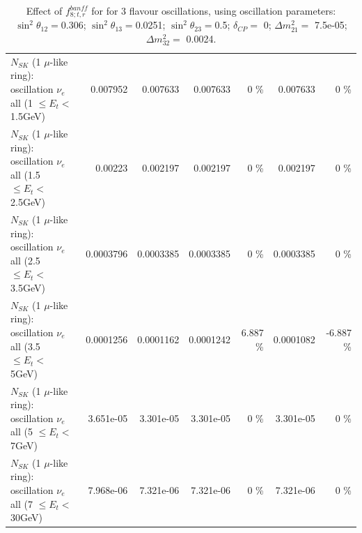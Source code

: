 \begin{table}
\begin{tabular}{| l | r | r | r  r | r  r |}
$N_{SK}$ (1 $\mu$-like ring): oscillation $\nu_{e}$ all (1 $\leq E_{t} <$ 1.5GeV) &        0.007952 &        0.007633 &        0.007633 &        0 \%  &        0.007633 &        0 \%  \\ 
$N_{SK}$ (1 $\mu$-like ring): oscillation $\nu_{e}$ all (1.5 $\leq E_{t} <$ 2.5GeV) &         0.00223 &        0.002197 &        0.002197 &        0 \%  &        0.002197 &        0 \%  \\ 
$N_{SK}$ (1 $\mu$-like ring): oscillation $\nu_{e}$ all (2.5 $\leq E_{t} <$ 3.5GeV) &       0.0003796 &       0.0003385 &       0.0003385 &        0 \%  &       0.0003385 &        0 \%  \\ 
$N_{SK}$ (1 $\mu$-like ring): oscillation $\nu_{e}$ all (3.5 $\leq E_{t} <$ 5GeV) &       0.0001256 &       0.0001162 &       0.0001242 &    6.887 \%  &       0.0001082 &   -6.887 \%  \\ 
 $N_{SK}$ (1 $\mu$-like ring): oscillation $\nu_{e}$ all (5 $\leq E_{t} <$ 7GeV) &       3.651e-05 &       3.301e-05 &       3.301e-05 &        0 \%  &       3.301e-05 &        0 \%  \\ 
$N_{SK}$ (1 $\mu$-like ring): oscillation $\nu_{e}$ all (7 $\leq E_{t} <$ 30GeV) &       7.968e-06 &       7.321e-06 &       7.321e-06 &        0 \%  &       7.321e-06 &        0 \%  \\ 
\hline
\hline
\end{tabular}
\caption{ Effect of $f_{8; t, r}^{banff}$ for for 3 flavour oscillations, using oscillation parameters:  $\sin^2\theta_{12} = $0.306; $\sin^2\theta_{13} = $0.0251; $\sin^2\theta_{23} = $0.5; $\delta_{CP} = $        0; $\Delta m^2_{21} = $    7.5e-05; $\Delta m^2_{32} = $    0.0024. }
\label{tab:num_banff_08_1RmuT_3f_osc_t13:0.0251}
\end{table}
\clearpage
